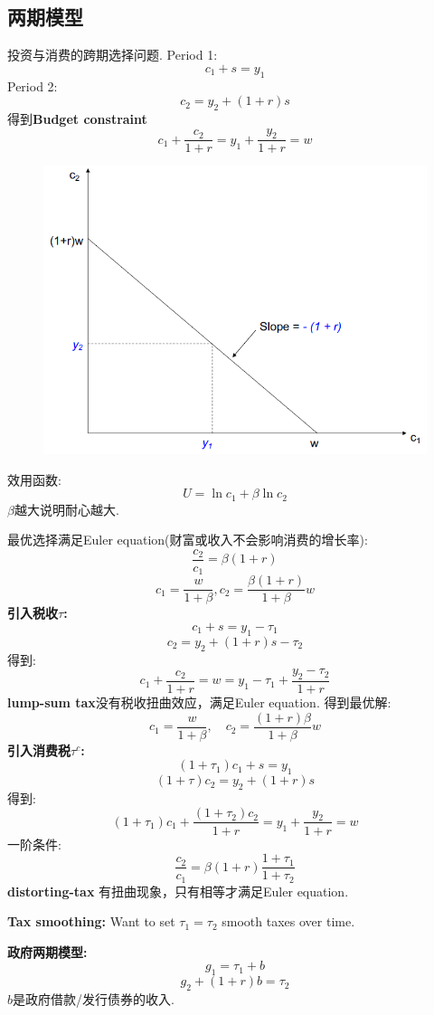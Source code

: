 \documentclass[UTF8, onecolumn, a4paper, 12pt]{article}
\begin{document}
\subsection{两期模型}
投资与消费的跨期选择问题.
Period 1:
$$c_1 + s = y_1$$
Period 2:
$$c_2 = y_2 + (1+r)s$$
得到\textbf{Budget constraint}
$$c_1 +\frac{c_2}{1+r} = y_1 + \frac{y_2}{1+r} = w$$
\begin{figure}[htb]
	\centering
	\includegraphics[width=0.35\linewidth]{budget}
\end{figure}
效用函数:
$$U = \ln c_1 + \beta \ln c_2$$
$\beta$越大说明耐心越大.

最优选择满足Euler equation(财富或收入不会影响消费的增长率):
$$\frac{c_2}{c_1} = \beta(1+r)$$
$$c_1 = \frac{w}{1+\beta}, c_2 = \frac{\beta(1+r)}{1+\beta}w$$
\textbf{引入税收$\tau$:}
$$c_1 + s = y_1 - \tau_1$$
$$c_2 = y_2 +(1+r)s - \tau_2$$
得到:
$$c_1 +\frac{c_2}{1+r} = w = y_1 - \tau_1 +\frac{y_2 - \tau_2}{1+r}$$
\textbf{lump-sum tax}没有税收扭曲效应，满足Euler equation.
得到最优解:
$$c_1 = \frac{w}{1+\beta},\quad c_2 = \frac{(1+r)\beta}{1+\beta}w$$
\textbf{引入消费税$\tau^c$:}
$$(1+\tau_1)c_1 +s = y_1$$
$$(1+\tau)c_2 = y_2 + (1+r)s$$
得到:
$$(1+\tau_1)c_1 + \frac{(1+\tau_2)c_2}{1+r} = y_1+\frac{y_2}{1+r} = w$$
一阶条件:
$$\frac{c_2}{c_1} = \beta(1+r)\frac{1+\tau_1}{1+\tau_2}$$
\textbf{distorting-tax} 有扭曲现象，只有相等才满足Euler equation.

\textbf{Tax smoothing:} Want to set $\tau_1 = \tau_2$ smooth taxes over time.

\textbf{政府两期模型:}
$$g_1 = \tau_1 + b$$
$$g_2 + (1+r)b = \tau_2$$
$b$是政府借款/发行债券的收入.
\end{document}
